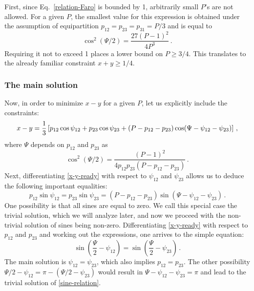 \documentclass[11pt]{article}
\begin{document}
First, since Eq.~\eqref{relation-Faro} is bounded by 1, arbitrarily small $P$'s are not allowed.
For a given $P$, the smallest value for this expression is obtained 
under the assumption of equipartition $p_{12} = p_{23} = p_{31} = P/3$ and is equal to
\begin{equation}
\cos^2(\Psi/2) = \frac{27(P - 1)^2}{4 P^3}\,.
\label{relation-Faro-equal}
\end{equation}
Requiring it not to exceed 1 places a lower bound on $P \ge 3/4$.
This translates to the already familiar constraint $x+y \ge 1/4$.

\subsubsection{The main solution}

Now, in order to minimize $x-y$ for a given $P$, let us explicitly include the constraints:
\begin{equation}
x-y = {1 \over 3}\left[p_{12}\cos\psi_{12} + p_{23}\cos\psi_{23} + (P - p_{12} - p_{23})\cos(\Psi-\psi_{12}-\psi_{23})\right]\,,
\label{x-y-ready}
\end{equation} 
where $\Psi$ depends on $p_{12}$ and $p_{23}$ as
\begin{equation}
\cos^2(\Psi/2) = \frac{(P - 1)^2}{4p_{12}p_{23}(P - p_{12} - p_{23})}\,.
\label{relation-Faro-2}
\end{equation}
Next, differentiating \eqref{x-y-ready} with respect to $\psi_{12}$ and $\psi_{23}$ allows us to deduce the following important equalities:
\begin{equation}
p_{12}\sin \psi_{12} = p_{23}\sin \psi_{23} = (P - p_{12} - p_{23})\sin(\Psi-\psi_{12}-\psi_{23})\,.\label{sine-relation}
\end{equation}
One possibility is that all sines are equal to zero. We call this special case the trivial solution, which we will analyze later, 
and now we proceed with the non-trivial solution of sines being non-zero.
Differentiating \eqref{x-y-ready} with respect to $p_{12}$ and $p_{23}$ and working out the expressions, one arrives to the simple equation:
\begin{equation}
\sin\left(\frac{\Psi}{2}-\psi_{12}\right) = \sin\left(\frac{\Psi}{2}-\psi_{23}\right)\,.
\end{equation}
The main solution is $\psi_{12} = \psi_{23}$, which also implies $p_{12} = p_{23}$. 
The other possibility $\Psi/2 - \psi_{12} = \pi - (\Psi/2 - \psi_{23})$
would result in $\Psi - \psi_{12} - \psi_{23} = \pi$ and lead to the trivial solution of \eqref{sine-relation}.
\end{document}
